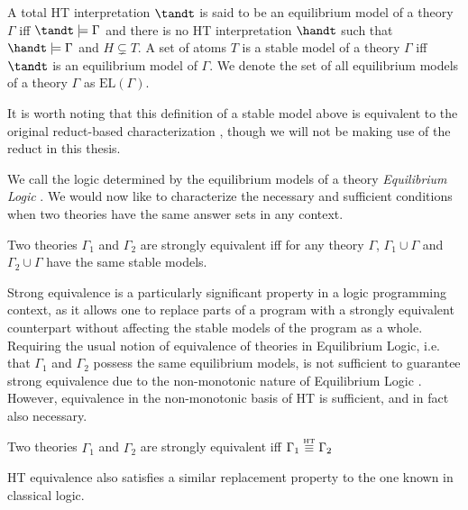 \begin{definition}
  A total HT interpretation $\tandt$ is said to be an equilibrium
  model of a theory $\Gamma$ iff $\tandt \models \Gamma$ and there is
  no HT interpretation $\handt$ such that $\handt \models \Gamma$ and
  $H \subsetneq T$. A set of atoms $T$ is a stable model of a theory
  $\Gamma$ iff $\tandt$ is an equilibrium model of $\Gamma$. We denote
  the set of all equilibrium models of a theory $\Gamma$ as
  $\text{EL}(\Gamma)$.
\end{definition}

It is worth noting that this definition of a stable model above is
equivalent to the original reduct-based characterization
\cite{lipeva01a}, though we will not be making use of the reduct in
this thesis.

We call the logic determined by the equilibrium models of a theory
\emph{Equilibrium Logic} \cite{pearce06a}. We would now like to
characterize the necessary and sufficient conditions when two theories
have the same answer sets in any context.

\begin{definition}
  Two theories $\Gamma_1$ and $\Gamma_2$ are strongly equivalent iff for
  any theory $\Gamma$, $\Gamma_1 \cup \Gamma$ and
  $\Gamma_2 \cup \Gamma$ have the same stable models.
\end{definition}

Strong equivalence is a particularly significant property in a logic
programming context, as it allows one to replace parts of a program
with a strongly equivalent counterpart without affecting the stable
models of the program as a whole. Requiring the usual notion of
equivalence of theories in Equilibrium Logic, i.e. that $\Gamma_1$ and
$\Gamma_2$ possess the same equilibrium models, is not sufficient to
guarantee strong equivalence due to the non-monotonic nature of
Equilibrium Logic \cite{lipeva01a}.  However, equivalence in the
non-monotonic basis of HT is sufficient, and in fact also necessary.

\begin{proposition}
  Two theories $\Gamma_1$ and $\Gamma_2$ are strongly equivalent
  iff $\Gamma_1 \stackrel{\normalfont\mbox{\tiny HT}}{\equiv} \Gamma_2$
\end{proposition}

HT equivalence also satisfies a similar replacement property
to the one known in classical logic.

